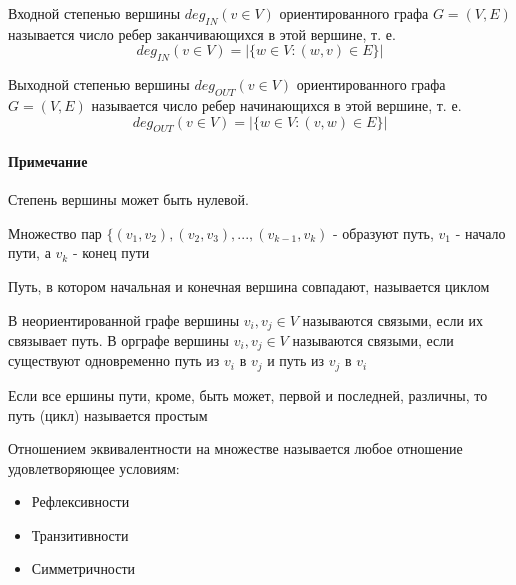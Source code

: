 \begin{Def}
	Входной степенью вершины $ deg _{IN} (v \in V)$ ориентированного графа $ G = (V,E) $ называется число ребер заканчивающихся в этой вершине, т. е. \[ deg _{IN} (v \in V) = \left| \{ w \in V : (w, v) \in E \} \right| \]
\end{Def}

\begin{Def}
	Выходной степенью вершины $ deg _{OUT} (v \in V)$ ориентированного графа $ G = (V,E) $ называется число ребер начинающихся в этой вершине, т. е. \[ deg _{OUT} (v \in V) = \left| \{ w \in V : (v, w) \in E \} \right| \]
\end{Def}

\paragraph{Примечание}

Степень вершины может быть нулевой.

\begin{Def}
	Множество пар $ \{ (v_1, v_2), (v_2, v_3), ... , (v_{k-1}, v_{k}) $ - образуют путь, $ v_1 $ - начало пути, а $ v_k $ - конец пути
\end{Def}

\begin{Def}
	Путь, в котором начальная и конечная вершина совпадают, называется циклом
\end{Def}

\begin{Def}
	В неориентированной графе вершины $ v_i, v_j \in V $ называются связыми, если их связывает путь.
	В орграфе вершины $ v_i, v_j \in V $ называются связыми, если существуют одновременно путь из $ v_i $ в $ v_j $ и путь из $ v_j $ в $ v_i $
\end{Def}

\begin{Def}
	Если все ершины пути, кроме, быть может, первой и последней, различны, то путь (цикл) называется простым
\end{Def}

\begin{Def}
	Отношением эквивалентности на множестве называется любое отношение удовлетворяющее условиям:

\begin{itemize}
\item Рефлексивности

\item Транзитивности

\item Симметричности
\end{itemize}
\end{Def}

